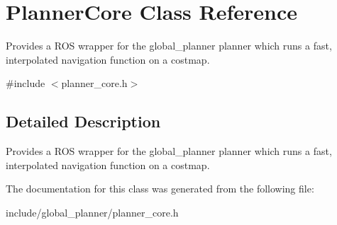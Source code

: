 \hypertarget{class_planner_core}{}\section{Planner\+Core Class Reference}
\label{class_planner_core}


Provides a R\+OS wrapper for the global\+\_\+planner planner which runs a fast, interpolated navigation function on a costmap.  




{\ttfamily \#include $<$planner\+\_\+core.\+h$>$}



\subsection{Detailed Description}
Provides a R\+OS wrapper for the global\+\_\+planner planner which runs a fast, interpolated navigation function on a costmap. 

The documentation for this class was generated from the following file\+:\begin{DoxyCompactItemize}
\item 
include/global\+\_\+planner/planner\+\_\+core.\+h\end{DoxyCompactItemize}
